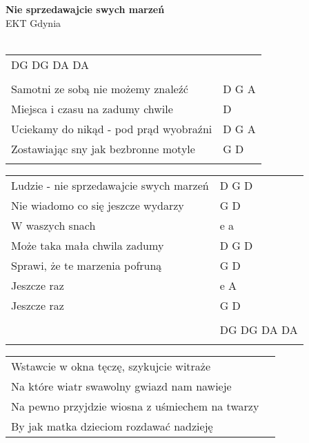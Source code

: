 \documentclass[a5paper]{article}
\begin{document}


\noindent
\fontsize{12pt}{15pt}\selectfont
\textbf{Nie sprzedawajcie swych marzeń} \\
\fontsize{8pt}{10pt}\selectfont
EKT Gdynia \\ \\
\fontsize{10pt}{12pt}\selectfont
{}
\begin{tabular}{@{}p{8.00cm}p{3cm}@{}}
\noindent
DG DG DA DA \\ \\

Samotni ze sobą nie możemy znaleźć & D G A \\
Miejsca i czasu na zadumy chwile & D \\
Uciekamy do nikąd - pod prąd wyobraźni & D G A \\
Zostawiając sny jak bezbronne motyle & G D \\ \\
\end{tabular}

\noindent
\begin{tabular}{@{}p{7.00cm}p{3cm}@{}}
Ludzie - nie sprzedawajcie swych marzeń & D G D \\
Nie wiadomo co się jeszcze wydarzy & G D \\
W waszych snach & e a \\
Może taka mała chwila zadumy & D G D \\
Sprawi, że te marzenia pofruną & G D \\
Jeszcze raz & e A \\
Jeszcze raz & G D \\ \\
& DG DG DA DA \\ \\
\end{tabular}

\noindent
\begin{tabular}{@{}p{7.00cm}p{3cm}@{}}
Wstawcie w okna tęczę, szykujcie witraże \\
Na które wiatr swawolny gwiazd nam nawieje \\
Na pewno przyjdzie wiosna z uśmiechem na twarzy \\
By jak matka dzieciom rozdawać nadzieję \\
\end{tabular}
\end{document}
